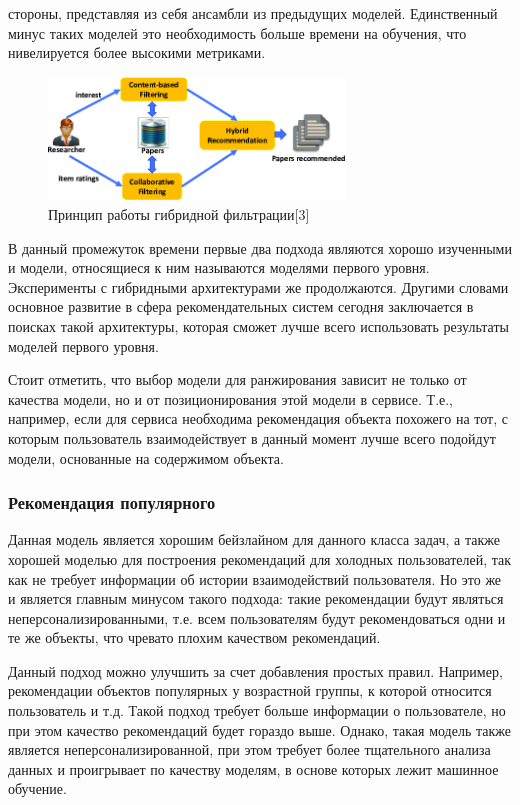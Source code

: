 \documentclass[bachelor, och, coursework]{SCWorks}
\begin{document}
\begin{enumerate}
    стороны, представляя из себя ансамбли из предыдущих моделей. Единственный минус таких моделей это необходимость 
    больше времени на обучения, что нивелируется более высокими метриками.
    \begin{figure}[H]
        \centering
        \includegraphics[width=0.7\textwidth]{pic/3}
        \caption{Принцип работы гибридной фильтрации[3]}
        \label{fig:img1}
    \end{figure}
\end{enumerate}

В данный промежуток времени первые два подхода являются хорошо изученными и модели, относящиеся к ним называются
моделями первого уровня. Эксперименты с гибридными архитектурами же продолжаются. Другими словами основное развитие
в сфера рекомендательных систем сегодня заключается в поисках такой архитектуры, которая сможет лучше всего использовать
результаты моделей первого уровня.

Стоит отметить, что выбор модели для ранжирования зависит не только от качества модели, но и от позиционирования
этой модели в сервисе. Т.е., например, если для сервиса необходима рекомендация объекта похожего на тот, с которым пользователь
взаимодействует в данный момент лучше всего подойдут модели, основанные на содержимом объекта.
\subsubsection{Рекомендация популярного}
Данная модель является хорошим бейзлайном для данного класса задач, а также хорошей моделью для построения
рекомендаций для холодных пользователей, так как не требует информации об истории взаимодействий пользователя.
Но это же и является главным минусом такого подхода: такие рекомендации будут являться неперсонализированными,
т.е. всем пользователям будут рекомендоваться одни и те же объекты, что чревато плохим качеством рекомендаций.

Данный подход можно улучшить за счет добавления простых правил. Например, рекомендации объектов популярных у
возрастной группы, к которой относится пользователь и т.д. Такой подход требует больше информации о пользователе,
но при этом качество рекомендаций будет гораздо выше. Однако, такая модель также является неперсонализированной,
при этом требует более тщательного анализа данных и проигрывает по качеству моделям, в основе которых лежит машинное
обучение.
\end{document}
